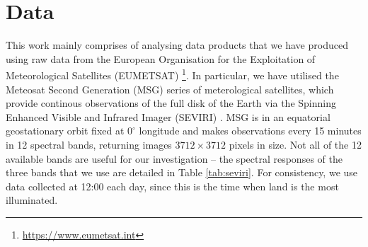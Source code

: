 \section{Data}
\begin{table}
  \centering
  \caption{Spectral characteristics of the three SEVIRI channels used
    in our work. Shown are the central, minimum and maximum
    wavelengths for the three spectral bands that we use.}
  \label{tab:seviri}
\end{table}

This work mainly comprises of analysing data products that we have
produced using raw data from the European Organisation for the
Exploitation of Meteorological Satellites
(EUMETSAT) \footnote{\url{https://www.eumetsat.int}}. In particular,
we have utilised the Meteosat Second Generation (MSG) series of
meterological satellites, which provide continous observations of the
full disk of the Earth via the Spinning Enhanced Visible and Infrared
Imager (SEVIRI) \citep{schmetz2002}. MSG is in an equatorial
geostationary orbit fixed at $0^{\circ}$ longitude and makes observations
every 15 minutes in 12 spectral bands, returning images $3712 \times 3712$
pixels in size. Not all of the 12 available bands are useful for our
investigation -- the spectral responses of the three bands that we use
are detailed in Table \ref{tab:seviri}. For consistency, we use data
collected at 12:00 each day, since this is the time when land is the
most illuminated.

